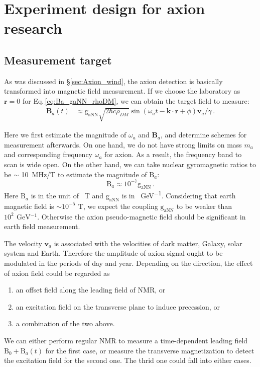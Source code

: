 \section{Experiment design for axion research}

\subsection{Measurement target}\label{sec:Experiment_Design:Measurement_target}

As was discussed in \S\ref{sec:Axion_wind}, the axion detection is basically transformed into magnetic field measurement. If we choose the laboratory as $\mathbf{r} = 0$ for Eq.\,\eqref{eq:Ba_gaNN_rhoDM}, we can obtain the target field to measure:
\begin{align}
    \mathbf{B}_{a}(t) &\approx \mathrm{g_{aNN}} \sqrt{2 \hbar c \rho_{DM}} \sin(\omega_a t -\mathbf{k}\cdot\mathbf{r} + \phi) \mathbf{v}_a / \gamma \label{eq:Ba_vector}\,.
\end{align}

Here we first estimate the magnitude of $\omega_a$ and $\mathbf{B}_{a}$, and determine schemes for measurement afterwards. On one hand, we do not have strong limits on mass $m_a$ and corresponding frequency $\omega_a$ for axion. As a result, the frequency band to scan is wide open. On the other hand, we can take nuclear gyromagnetic ratios to be $\sim$ \SI{10}{\MHz/ \tesla} to estimate the magnitude of $\mathrm{B}_{a}$:
\begin{equation}
    \mathrm{B}_{a} \approx 10^{-7} \mathrm{g_{aNN}}\,. 
\end{equation}
Here $\mathrm{B}_{a}$ is in the unit of \SI{}{\tesla} and $\mathrm{g_{aNN}}$ is in \SI{}{\GeV^{-1}}. Considering that earth magnetic field is $\sim 10^{-5}\,\SI{}{\tesla}$, we expect the coupling $\mathrm{g_{aNN}}$ to be weaker than $10^{2}\,\SI{}{\GeV^{-1}}$. Otherwise the axion pseudo-magnetic field should be significant in earth field measurement. 

The velocity $\mathbf{v}_a $ is associated with the velocities of dark matter, Galaxy, solar system and Earth. Therefore the amplitude of axion signal ought to be modulated in the periods of day and year\cite{Gramolin_PhysRevD.105.035029}. 
Depending on the direction, the effect of axion field could be regarded as
\begin{enumerate}
    \item an offset field along the leading field of NMR, or
    \item an excitation field on the transverse plane to induce precession, or
    \item a combination of the two above. 
\end{enumerate}
We can either perform regular NMR to measure a time-dependent leading field $\mathrm{B}_0 + \mathrm{B}_{a}(t)$ for the first case, or measure the transverse magnetization to detect the excitation field for the second one. The thrid one could fall into either cases. 

